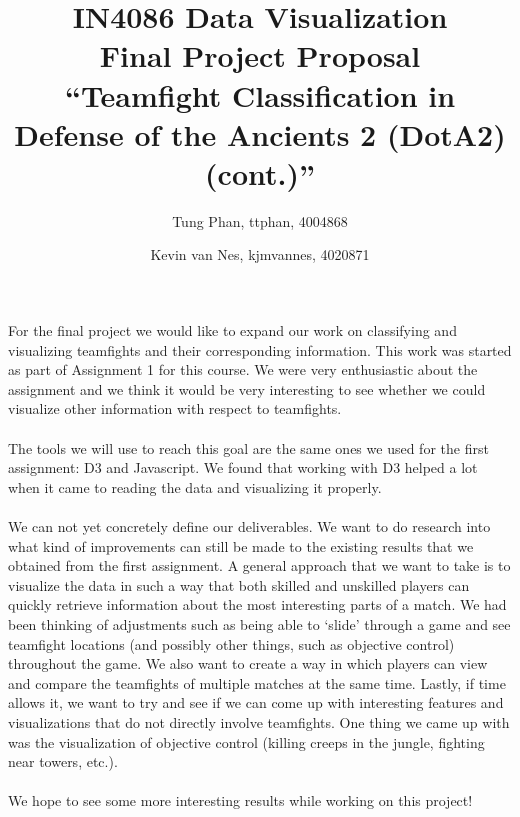 \documentclass[11pt,twoside,a4paper]{article}
\title{
  IN4086 Data Visualization\\
  Final Project Proposal\\
  ``Teamfight Classification in Defense of the Ancients 2 (DotA2) (cont.)''
}
\author{
    Tung Phan, ttphan, 4004868 \and
    Kevin van Nes, kjmvannes, 4020871
}
\begin{document}
\maketitle

For the final project we would like to expand our work on classifying and visualizing teamfights and their corresponding information. This work was started as part of Assignment 1 for this course. We were very enthusiastic about the assignment and we think it would be very interesting to see whether we could visualize other information with respect to teamfights.\\
\\
The tools we will use to reach this goal are the same ones we used for the first assignment: D3 and Javascript. We found that working with D3 helped a lot when it came to reading the data and visualizing it properly.\\
\\
We can not yet concretely define our deliverables. We want to do research into what kind of improvements can still be made to the existing results that we obtained from the first assignment. A general approach that we want to take is to visualize the data in such a way that both skilled and unskilled players can quickly retrieve information about the most interesting parts of a match. We had been thinking of adjustments such as being able to `slide' through a game and see teamfight locations (and possibly other things, such as objective control) throughout the game. We also want to create a way in which players can view and compare the teamfights of multiple matches at the same time. Lastly, if time allows it, we want to try and see if we can come up with interesting features and visualizations that do not directly involve teamfights. One thing we came up with was the visualization of objective control (killing creeps in the jungle, fighting near towers, etc.).\\
\\
We hope to see some more interesting results while working on this project!
\end{document}
